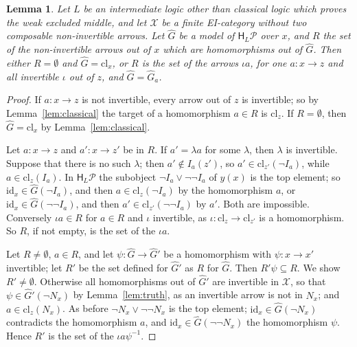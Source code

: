 \documentclass[11pt]{amsart}
\newtheorem{lem}[thm]{Lemma}
\theoremstyle{definition}
\newcommand{\HH}{\mathsf H}
\newcommand{\cX}{\mathcal X}
\newcommand{\cP}{\mathcal P}
\newcommand{\id}{\mathrm{id}}
\begin{document}
\begin{lem}\label{lem:top}
Let $L$ be an intermediate logic other than classical logic which
proves the weak excluded middle, and let $\cX$ be a finite
EI-category without two composable non-invertible arrows. Let $\hat G$
be a model of $\HH_L\cP$ over $x$, and $R$ the set of the
non-invertible arrows out of $x$ which are homomorphisms out of $\hat
G$. Then either $R=\emptyset$ and $\hat G=\mathrm{cl}_x$, or $R$ is the
set of the arrows $\iota a$, for one $a\colon x\to z$ and all
invertible $\iota$ out of $z$, and $\hat G=\hat G_a$.
\end{lem}
\begin{proof}
If $a\colon x\to z$ is not invertible, every arrow out of $z$ is
invertible; so by Lemma~\ref{lem:classical} the target of a
homomorphism $a\in R$ is $\mathrm{cl}_z$. If $R=\emptyset$, then
$\hat G=\mathrm{cl}_x$ by Lemma~\ref{lem:classical}.

Let $a\colon x\to z$ and $a'\colon x\to z'$ be in $R$. If $a'=\lambda
a$ for some $\lambda$, then $\lambda$ is invertible. Suppose that
there is no such $\lambda$; then $a'\notin I_a(z')$, so
$a'\in\mathrm{cl}_{z'}(\neg I_a)$, while $a\in\mathrm{cl}_z(I_a)$. In
$\HH_L\cP$ the subobject $\neg I_a\vee\neg\neg I_a$ of $y(x)$ is the
top element; so $\id_x\in\hat G(\neg I_a)$, and then $a\in
\mathrm{cl}_z(\neg I_a)$ by the homomorphism $a$, or $\id_x\in\hat
G(\neg\neg I_a)$, and then $a'\in\mathrm{cl}_{z'}(\neg\neg I_a)$ by
$a'$. Both are impossible. Conversely $\iota a\in R$ for $a\in R$ and
$\iota$ invertible, as $\iota\colon\mathrm{cl}_z\to\mathrm{cl}_{z'}$ is
a homomorphism. So $R$, if not empty, is the set of the $\iota a$.

Let $R\ne\emptyset$, $a\in R$, and let $\psi\colon\hat G\to\hat G'$ be
a homomorphism with $\psi\colon x\to x'$ invertible; let $R'$ be the
set defined for $\hat G'$ as $R$ for $\hat G$. Then $R'\psi\subseteq
R$. We show $R'\ne\emptyset$. Otherwise all homomorphisms out of $\hat
G'$ are invertible in $\cX$, so that $\psi\in\hat G'(\neg N_x)$ by
Lemma~\ref{lem:truth}, as an invertible arrow is not in $N_x$; and
$a\in\mathrm{cl}_z(N_x)$. As before $\neg N_x\vee\neg\neg N_x$ is the
top element; $\id_x\in\hat G(\neg N_x)$ contradicts the homomorphism
$a$, and $\id_x\in\hat G(\neg\neg N_x)$ the homomorphism $\psi$. Hence
$R'$ is the set of the $\iota a\psi^{-1}$.


\end{proof}
\end{document}
